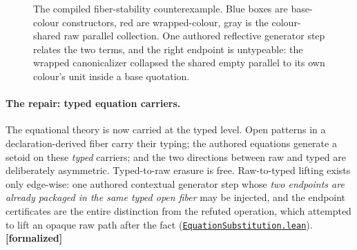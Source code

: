\documentclass[11pt]{article}
\newcommand{\leanfile}[2]{\href{https://github.com/zariuq/MeTTapedia/blob/main/lean/mettapedia/Mettapedia/#1}{\code{#2}}}
\newcommand{\code}[1]{\texttt{#1}}
\newcommand{\formalized}{\textbf{[formalized]}}
\begin{document}
\begin{figure}[h]\centering
{}
\caption{The compiled fiber-stability counterexample.  Blue boxes are
base-colour constructors, red are wrapped-colour, gray is the
colour-shared raw parallel collection.  One authored reflective generator
step relates the two terms, and the right endpoint is untypeable: the
wrapped canonicalizer collapsed the shared empty parallel to its own
colour's unit inside a base quotation.}
\label{fig:mixedcolour}
\end{figure}

\paragraph{The repair: typed equation carriers.} The equational theory
is now carried at the typed level.  Open patterns in a declaration-derived
fiber carry their typing; the authored equations generate a setoid on
these \emph{typed} carriers; and the two directions between raw and
typed are deliberately asymmetric.  Typed-to-raw erasure is free.
Raw-to-typed lifting exists only edge-wise: one authored contextual
generator step whose \emph{two endpoints are already packaged in the
same typed open fiber} may be injected, and the endpoint certificates
are the entire distinction from the refuted operation, which attempted
to lift an opaque raw path after the fact
(\leanfile{GSLT/LanguageDef/EquationSubstitution.lean}{EquationSubstitution.lean}).
\formalized
\end{document}
